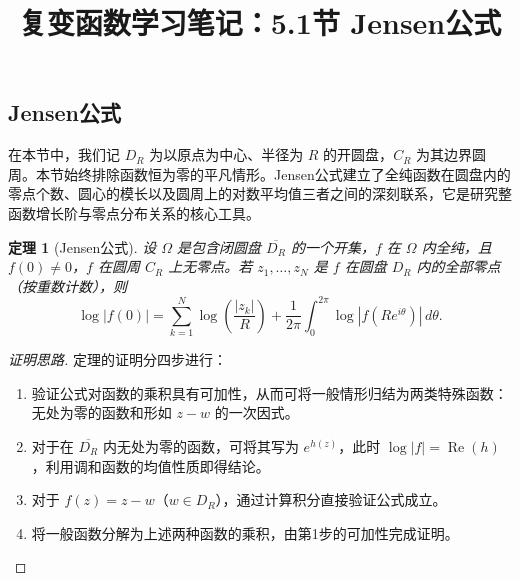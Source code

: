 \documentclass[UTF8]{ctexart}
\title{复变函数学习笔记：5.1节 Jensen公式}
\author{}
\date{}
\newtheorem{theorem}{定理}[section]
\numberwithin{equation}{section}
\begin{document}
\maketitle

\setcounter{section}{5}
\setcounter{subsection}{0}
\subsection{Jensen公式}

在本节中，我们记 $D_R$ 为以原点为中心、半径为 $R$ 的开圆盘，$C_R$ 为其边界圆周。本节始终排除函数恒为零的平凡情形。Jensen公式建立了全纯函数在圆盘内的零点个数、圆心的模长以及圆周上的对数平均值三者之间的深刻联系，它是研究整函数增长阶与零点分布关系的核心工具。

\begin{theorem}[Jensen公式]
设 $\Omega$ 是包含闭圆盘 $\overline{D_R}$ 的一个开集，$f$ 在 $\Omega$ 内全纯，且 $f(0)\neq0$，$f$ 在圆周 $C_R$ 上无零点。若 $z_1,\dots,z_N$ 是 $f$ 在圆盘 $D_R$ 内的全部零点（按重数计数），则
\begin{equation}\label{eq:jensen}
\log|f(0)| = \sum_{k=1}^{N} \log\left(\frac{|z_k|}{R}\right) + \frac{1}{2\pi} \int_0^{2\pi} \log|f(Re^{i\theta})| \, d\theta .
\end{equation}
\end{theorem}

\begin{proof}[证明思路]
定理的证明分四步进行：
\begin{enumerate}
    \item 验证公式对函数的乘积具有可加性，从而可将一般情形归结为两类特殊函数：无处为零的函数和形如 $z-w$ 的一次因式。
    \item 对于在 $\overline{D_R}$ 内无处为零的函数，可将其写为 $e^{h(z)}$，此时 $\log|f| = \operatorname{Re}(h)$，利用调和函数的均值性质即得结论。
    \item 对于 $f(z)=z-w$（$w\in D_R$），通过计算积分直接验证公式成立。
    \item 将一般函数分解为上述两种函数的乘积，由第1步的可加性完成证明。
\end{enumerate}
\end{proof}
\end{document}
